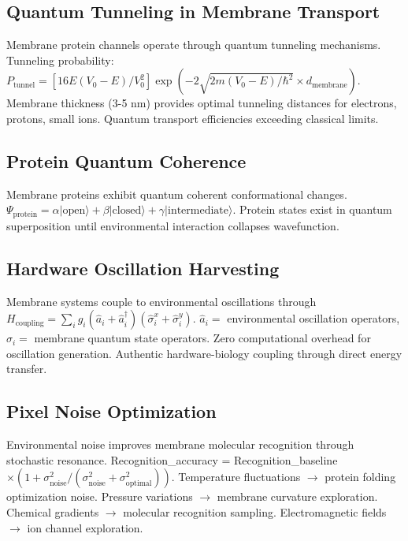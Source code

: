 \documentclass[12pt,a4paper]{article}
\begin{document}
\subsection{Quantum Tunneling in Membrane Transport}

Membrane protein channels operate through quantum tunneling mechanisms. Tunneling probability: $P_{\text{tunnel}} = [16E(V_0 - E)/V_0^2] \exp(-2\sqrt{2m(V_0 - E)/\hbar^2} \times d_{\text{membrane}})$. Membrane thickness (3-5 nm) provides optimal tunneling distances for electrons, protons, small ions. Quantum transport efficiencies exceeding classical limits.

\subsection{Protein Quantum Coherence}

Membrane proteins exhibit quantum coherent conformational changes. $\Psi_{\text{protein}} = \alpha|\text{open}\rangle + \beta|\text{closed}\rangle + \gamma|\text{intermediate}\rangle$. Protein states exist in quantum superposition until environmental interaction collapses wavefunction.

\subsection{Hardware Oscillation Harvesting}

Membrane systems couple to environmental oscillations through $H_{\text{coupling}} = \sum_i g_i (\hat{a}_i + \hat{a}_i^\dagger)(\hat{\sigma}_i^x + \hat{\sigma}_i^y)$. $\hat{a}_i =$ environmental oscillation operators, $\hat{\sigma}_i =$ membrane quantum state operators. Zero computational overhead for oscillation generation. Authentic hardware-biology coupling through direct energy transfer.

\subsection{Pixel Noise Optimization}

Environmental noise improves membrane molecular recognition through stochastic resonance. Recognition_accuracy = Recognition_baseline $\times (1 + \sigma_{\text{noise}}^2/(\sigma_{\text{noise}}^2 + \sigma_{\text{optimal}}^2))$. Temperature fluctuations $\to$ protein folding optimization noise. Pressure variations $\to$ membrane curvature exploration. Chemical gradients $\to$ molecular recognition sampling. Electromagnetic fields $\to$ ion channel exploration.
\end{document}
